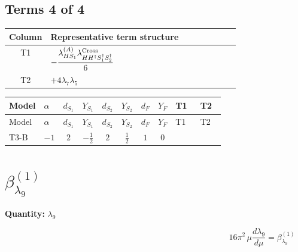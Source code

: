 \documentclass[8pt]{article}
\begin{document}
\begin{landscape}
\subsection*{Terms 4 of 4}
\begin{center}
\begin{tabular}{@{}c >{\raggedright\arraybackslash}p{0.82\linewidth}@{}}
\toprule
Column & Representative term structure \\
\midrule
T1 & \(\displaystyle -\frac{{\lambda_{HS_1}^{(A)}} {\lambda_{H H^\dagger S_1^\dagger S_2^\dagger}^{\rm Cross}}}{6}\) \\
\midrule
T2 & \(\displaystyle +4 {\lambda_{7}} {\lambda_5}\) \\
\midrule
\bottomrule
\end{tabular}
\end{center}
\smallskip
\tiny
\begin{longtable}{@{}llcccccc >{\raggedright\arraybackslash}p{0.21\linewidth} >{\raggedright\arraybackslash}p{0.21\linewidth}@{}}
\toprule
Model & $\alpha$ & $d_{S_1}$ & $Y_{S_1}$ & $d_{S_2}$ & $Y_{S_2}$ & $d_F$ & $Y_F$ & T1 & T2 \\
\midrule
\endfirsthead
\toprule
Model & $\alpha$ & $d_{S_1}$ & $Y_{S_1}$ & $d_{S_2}$ & $Y_{S_2}$ & $d_F$ & $Y_F$ & T1 & T2 \\
\midrule
\endhead
T3-B & $-1$ & $2$ & $-\frac{1}{2}$ & $2$ & $\frac{1}{2}$ & $1$ & $0$ & \scriptsize\adjustbox{max width=\linewidth}{$\begin{gathered} -\frac{{\lambda_{HS_1}^{(A)}} {\lambda_{H H^\dagger S_1^\dagger S_2^\dagger}^{\rm Cross}}}{6}\end{gathered}$} & \scriptsize\adjustbox{max width=\linewidth}{$\begin{gathered} +4 {\lambda_{7}} {\lambda_5}\end{gathered}$} \\
\midrule
\bottomrule
\end{longtable}
\clearpage
\section*{$\beta_{\lambda_{9}}^{(1)}$}
\noindent\textbf{Quantity: }$\lambda_{9}$\par\smallskip
\[16\pi^2\,\mu\frac{d \lambda_{9}}{d\mu}=\beta_{\lambda_{9}}^{(1)}\]

\end{landscape}
\end{document}
